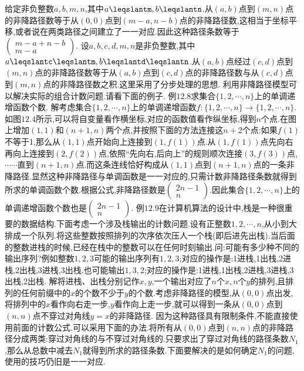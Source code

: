 给定非负整数$a,b,m,n$,其中$a\leqslantm,b\leqslantn$.从$(a,b)$点到$(m,n)$点的非降路径数等于从$(0,0)$点到$(m-a,n-b)$点的非降路径数,这相当于坐标平移,或者说在两类路径之间建立了一一对应.因此这种路径条数等于$\left(\begin{array}{c}m-a+n-b\\m-a\end{array}\right)$.
设$a,b,c,d,m,n$是非负整数,其中$a\leqslantc\leqslantm,b\leqslantd\leqslantn$.从$(a,b)$点经过$(c,d)$点到$(m,n)$点的非降路径数等于从$(a,b)$点到$(c,d)$点的非降路径数与从$(c,d)$点到$(m,n)$点的非降路径数之积.这里采用了分步处理的思想.
利用非降路径模型可以解决实际的组合计数问题.请看下面的例子.
例$12.8$求集合$\{1,2,\cdots,n\}$上的单调递增函数个数.
解考虑集合$\{1,2,\cdots,n\}$上的单调递增函数$f:\{1,2,\cdots,n\}\rightarrow\{1,2,\cdots,n\}$.如图$12.4$所示,可以将自变量看作横坐标,对应的函数值看作纵坐标,得到$n$个点.在图上增加$(1,1)$和$(n+1,n)$两个点,并按照下面的方法连接这$n+$2个点:如果$f(1)$不等于1,那么从$(1,1)$点开始向上连接到$(1,f(1))$点.从$(1,f(1))$点先向右再向上连接到$(2,f(2))$点,依照“先向右,后向上”的规则顺次连接$(3,f(3))$点,$\cdots\cdots$直到$(n+1,n)$点.而这条连线恰好构成从$(1,1)$点到$(n+1,n)$点的一条非降路径.显然这种非降路径与单调函数是一一对应的,只需计数非降路径条数就得到所求的单调函数个数.根据公式,非降路径数是$\left(\begin{array}{c}2n-1\\n\end{array}\right)$.因此集合$\{1,2,\cdots,n\}$上的单调递增函数个数也是$\left(\begin{array}{c}2n-1\\n\end{array}\right)$.
例$12.9$在计算机算法的设计中,栈是一种很重要的数据结构.下面考虑一个涉及栈输出的计数问题.设有正整数$1,2,\cdots,n$,从小到大排成一个队列.将这些整数按照排列的次序依次压人一个栈(即后进先出栈).当后面的整数进栈的时候,已经在栈中的整数可以在任何时刻输出.问:可能有多少种不同的输出序列?例如整数$1,2,3$可能的输出序列有$1,2,3$;对应的操作是:1进栈,1出栈,2进栈,2出栈,3进栈,3出栈.也可能输出$1,3,2$;对应的操作是:1进栈,1出栈,2进栈,3进栈,3出栈,2出栈.
解将进栈、出栈分别记作$x,y$,一个输出对应了$n$个$x,n$个$y$的排列,且排列的任何前缀中的$x$的个数不少于$y$的个数.考虑非降路径的模型,从$(0,0)$点出发,将排列中的$x$看作向右走一步,$y$看作向上走一步,就可以得到一条从$(0,0)$点到$(n,n)$点不穿过对角线$y=x$的非降路径.
因为这种路径具有限制条件,不能直接使用前面的计数公式.可以采用下面的办法.将所有从$(0,0)$点到$(n,n)$点的非降路径分成两类:穿过对角线的与不穿过对角线的.只要求出了穿过对角线的路径条数$N_{1}$,那么从总数中减去$N_{1}$就得到所求的路径条数.下面要解决的是如何确定$N_{1}$的问题,使用的技巧仍旧是一一对应.
